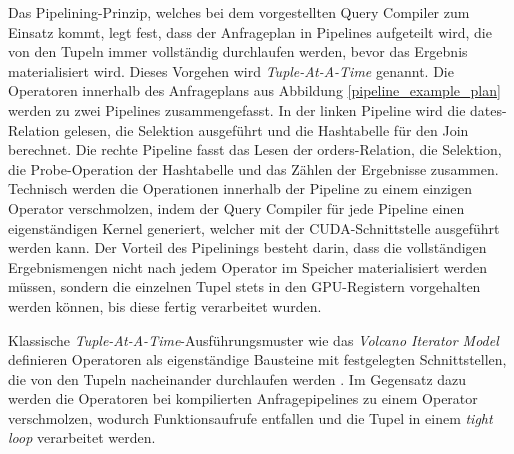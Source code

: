 Das Pipelining-Prinzip, welches bei dem vorgestellten Query Compiler zum Einsatz kommt, legt fest, dass der Anfrageplan in Pipelines aufgeteilt wird, die von den Tupeln immer vollständig durchlaufen werden, bevor das Ergebnis materialisiert wird.
Dieses Vorgehen wird \emph{Tuple-At-A-Time} genannt.
Die Operatoren innerhalb des Anfrageplans aus Abbildung \ref{pipeline_example_plan} werden zu zwei Pipelines zusammengefasst.
In der linken Pipeline wird die \textsf{dates}-Relation gelesen, die Selektion ausgeführt und die Hashtabelle für den Join berechnet.
Die rechte Pipeline fasst das Lesen der \textsf{orders}-Relation, die Selektion, die Probe-Operation der Hashtabelle und das Zählen der Ergebnisse zusammen.
Technisch werden die Operationen innerhalb der Pipeline zu einem einzigen Operator verschmolzen, indem der Query Compiler für jede Pipeline einen eigenständigen Kernel generiert, welcher mit der CUDA-Schnittstelle ausgeführt werden kann.
Der Vorteil des Pipelinings besteht darin, dass die vollständigen Ergebnismengen nicht nach jedem Operator im Speicher materialisiert werden müssen, sondern die einzelnen Tupel stets in den GPU-Registern vorgehalten werden können, bis diese fertig verarbeitet wurden.

Klassische \emph{Tuple-At-A-Time}-Ausführungsmuster wie das \emph{Volcano Iterator Model} definieren Operatoren als eigenständige Bausteine mit festgelegten Schnittstellen, die von den Tupeln nacheinander durchlaufen werden \cite{Graefe1994}.
Im Gegensatz dazu werden die Operatoren bei kompilierten Anfragepipelines zu einem Operator verschmolzen, wodurch Funktionsaufrufe entfallen und die Tupel in einem \emph{tight loop} \cite{Neumann2011} verarbeitet werden.

